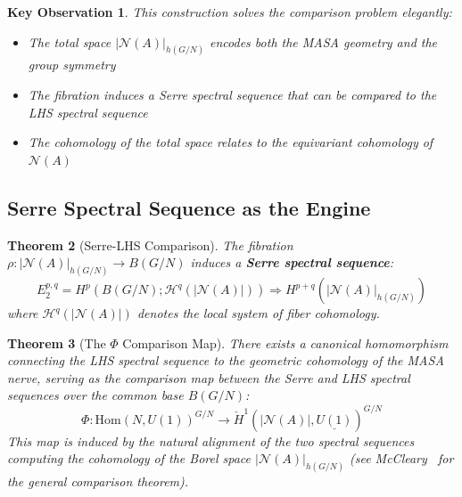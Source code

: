 \documentclass[11pt]{article}
\newtheorem{theorem}{Theorem}[section]
\newtheorem{keyobservation}[theorem]{Key Observation}
\begin{document}
\begin{keyobservation}\label{obs:bridge}
This construction solves the comparison problem elegantly:
\begin{itemize}
\item The total space $|\mathcal{N}(A)|_{h(G/N)}$ encodes both the MASA geometry and the group symmetry
\item The fibration induces a Serre spectral sequence that can be compared to the LHS spectral sequence
\item The cohomology of the total space relates to the equivariant cohomology of $\mathcal{N}(A)$
\end{itemize}
\end{keyobservation}

\subsection{Serre Spectral Sequence as the Engine}
\label{serre}

\begin{theorem}[Serre-LHS Comparison]\label{thm:serre-lhs}
The fibration $\rho: |\mathcal{N}(A)|_{h(G/N)} \to B(G/N)$ induces a \textbf{Serre spectral sequence}:
\[
E_2^{p,q} = H^p(B(G/N); \mathcal{H}^q(|\mathcal{N}(A)|)) \Rightarrow H^{p+q}(|\mathcal{N}(A)|_{h(G/N)})
\]
where $\mathcal{H}^q(|\mathcal{N}(A)|)$ denotes the local system of fiber cohomology.
\end{theorem}

\begin{theorem}[The $\Phi$ Comparison Map]\label{thm:phi-map}
There exists a canonical homomorphism connecting the LHS spectral sequence to the geometric cohomology of the MASA nerve, serving as the comparison map between the Serre and LHS spectral sequences over the common base $B(G/N)$:
\[
\Phi: \mathrm{Hom}(N, U(1))^{G/N} \longrightarrow \check{H}^1(|\mathcal{N}(A)|, \underline{U(1)})^{G/N}
\]
This map is induced by the natural alignment of the two spectral sequences computing the cohomology of the Borel space $|\mathcal{N}(A)|_{h(G/N)}$ (see McCleary~\cite[Chapter 5]{McCleary2001} for the general comparison theorem).
\end{theorem}
\end{document}
